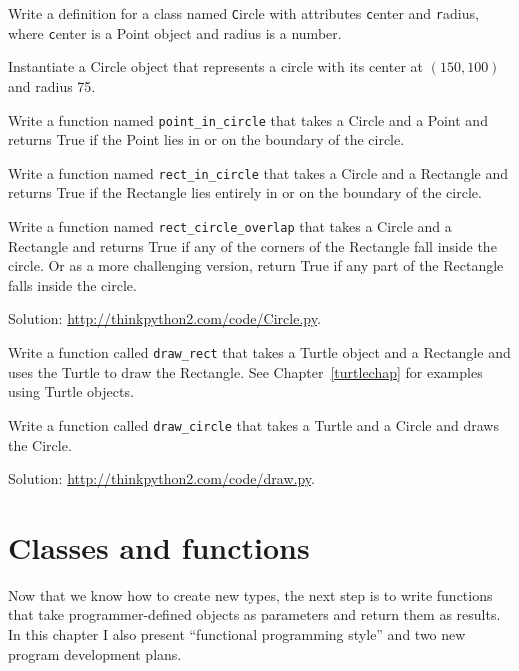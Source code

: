 \documentclass[
DIV=11,
fontsize=12,
twoside,
headinclude=false,
titlepage=firstiscover,
abstract=true,
headsepline=true,
footsepline=true,
chapterprefix=true, %
headings=big,
bibliography=totoc,%
captions=tableheading
]{scrbook}
\theoremstyle{definition}
\begin{document}
\begin{exercise}
\normalfont

Write a definition for a class named {\texttt Circle} with attributes
{\texttt center} and {\texttt radius}, where {\texttt center} is a Point object
and radius is a number.

Instantiate a Circle object that represents a circle with its center
at $(150, 100)$ and radius 75.

Write a function named \verb"point_in_circle" that takes a Circle and
a Point and returns True if the Point lies in or on the boundary of
the circle.

Write a function named \verb"rect_in_circle" that takes a Circle and a
Rectangle and returns True if the Rectangle lies entirely in or on the boundary
of the circle.

Write a function named \verb"rect_circle_overlap" that takes a Circle
and a Rectangle and returns True if any of the corners of the Rectangle fall
inside the circle.  Or as a more challenging version, return True if
any part of the Rectangle falls inside the circle.

Solution: \url{http://thinkpython2.com/code/Circle.py}.

\end{exercise}


\begin{exercise}
\normalfont

Write a function called \verb"draw_rect" that takes a Turtle object
and a Rectangle and uses the Turtle to draw the Rectangle.  See
Chapter~\ref{turtlechap} for examples using Turtle objects.

Write a function called \verb"draw_circle" that takes a Turtle and
a Circle and draws the Circle.

Solution: \url{http://thinkpython2.com/code/draw.py}.

\end{exercise}



\chapter{Classes and functions}
\label{time}

Now that we know how to create new types, the next
step is to write functions that take programmer-defined objects
as parameters and return them as results.  In this chapter I
also present ``functional programming style'' and two new
program development plans.
\end{document}
